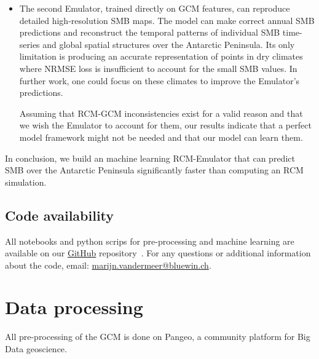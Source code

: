 \documentclass[a4paper,11pt,oneside]{report}
\begin{document}
\begin{itemize}
\begin{itemize}
        \item The second Emulator, trained directly on GCM features, can reproduce detailed high-resolution SMB maps. The model can make correct annual SMB predictions and reconstruct the temporal patterns of individual SMB time-series and global spatial structures over the Antarctic Peninsula. Its only limitation is producing an accurate representation of points in dry climates where NRMSE loss is insufficient to account for the small SMB values. In further work, one could focus on these climates to improve the Emulator's predictions. 
        
        Assuming that RCM-GCM inconsistencies exist for a valid reason and that we wish the Emulator to account for them, our results indicate that a perfect model framework might not be needed and that our model can learn them.  
    \end{itemize}
    
In conclusion, we build an machine learning RCM-Emulator that can predict SMB over the Antarctic Peninsula significantly faster than computing an RCM simulation. 
\end{itemize}

\section{Code availability}
All notebooks and python scrips for pre-processing and machine learning are available on our \href{https://github.com/marvande/master-thesis}{GitHub} repository~\cite{GitHub}. For any questions or additional information about the code, email: \href{mailto:marijn.vandermeer@bluewin.ch}{marijn.vandermeer@bluewin.ch}. 

\cleardoublepage
{}
{}
\printbibliography
\appendix

\chapter{Data processing}
All pre-processing of the GCM is done on Pangeo, a community platform for Big Data geoscience. 
\end{document}
